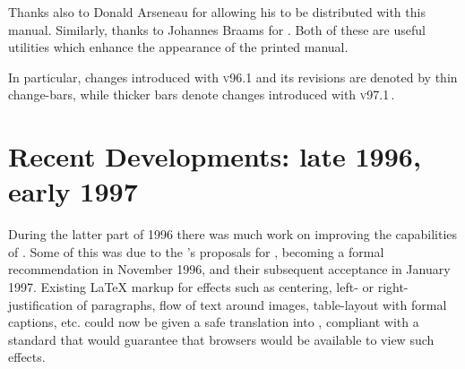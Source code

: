 \latex{\bigskip}\htmlrule

%
\noindent
Thanks also to Donald Arseneau  for allowing his  
to be distributed with this manual. 
Similarly, thanks to Johannes Braams  for .
%
\html{\\}%
Both of these are useful utilities which enhance the appearance of the printed manual. 
\begin{latexonly}%
In particular, changes introduced with  \textsc{v96.1} and its revisions are denoted 
by thin change-bars, while thicker bars denote changes introduced with  \textsc{v97.1}\,.%
\end{latexonly}



\clearpage
\section*{Recent Developments: late 1996, early 1997\label{recent97}}%
%
During the latter part of 1996 there was much work on improving the
capabilities of \latextohtml.
Some of this was due to the \WiiiC's proposals for \HTMLiii, 
becoming a formal recommendation in November 1996,
and their subsequent acceptance in January 1997. 
Existing \LaTeX{} markup for effects such as centering, left- 
or right-justification of paragraphs,
flow of text around images, table-layout with formal captions, etc.
could now be given a safe translation into \HTMLiii, compliant with a standard
that would guarantee that browsers would be available to view such effects.  

